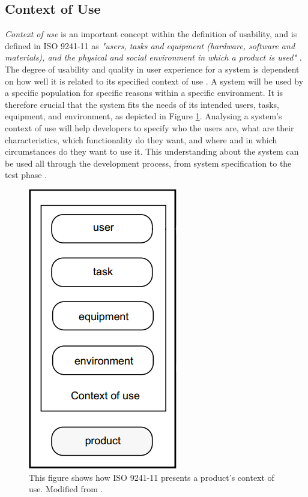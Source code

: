 \subsection{Context of Use}
\emph{Context of use} is an important concept within the definition of usability, and is defined in ISO 9241-11 as \emph{"users, tasks and equipment (hardware, software and materials), and the physical and social environment in which a product is used"} \cite{maguire2001context}. The degree of usability and quality in user experience for a system is dependent on how well it is related to its specified context of use \cite{bevan1995human}. A system will be used by a specific population for specific reasons within a specific environment. It is therefore crucial that the system fits the needs of its intended users, tasks, equipment, and environment, as depicted in Figure \ref{contextofuse}. Analysing a system's context of use will help developers to specify who the users are, what are their characteristics, which functionality do they want, and where and in which circumstances do they want to use it. This understanding about the system can be used all through the development process, from system specification to the test phase \cite{maguire2001context}.

\begin{figure} [ht!]
\centering
\includegraphics[scale=0.5]{contextOfUse.jpg}
\caption[Context of use]{This figure shows how ISO 9241-11 presents a product's context of use. Modified from \cite{bevan1995human}.}
\label{contextofuse}
\end{figure} 


